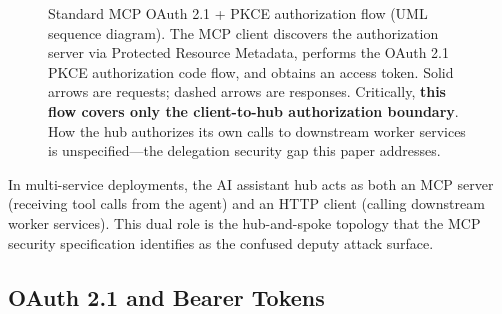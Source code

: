 \documentclass[journal]{IEEEtran}
\begin{document}
\begin{figure}[!ht]
\caption{Standard MCP OAuth 2.1 + PKCE authorization flow (UML sequence
diagram). The MCP client discovers the authorization server via Protected
Resource Metadata, performs the OAuth 2.1 PKCE authorization code flow, and
obtains an access token. Solid arrows are requests; dashed arrows are
responses. Critically, \textbf{this flow covers only the client-to-hub
authorization boundary}. How the hub authorizes its own calls to downstream
worker services is unspecified---the delegation security gap this paper
addresses.}
\label{fig:mcp_std_auth}
\end{figure}

In multi-service deployments, the AI assistant hub acts as both an MCP server
(receiving tool calls from the agent) and an HTTP client (calling downstream
worker services). This dual role is the hub-and-spoke topology that the MCP
security specification identifies as the confused deputy attack surface.

\subsection{OAuth 2.1 and Bearer Tokens}
\end{document}
